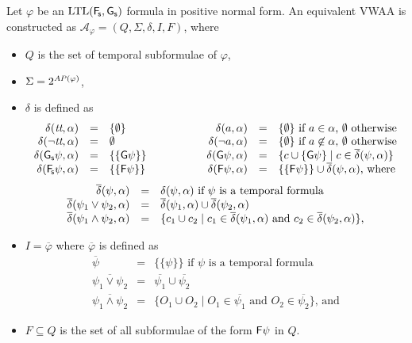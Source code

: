 \documentclass{llncs}
\newcommand{\true}{\textrm{{\it tt}}}
\newcommand{\AP}{\mathit{A\hskip-0.1ex P}}
\newcommand{\LTL}{{\mathrm{LTL}}}
\newcommand{\mA}{\mathcal{A}}
\begin{document}
Let $\varphi$ be an $\LTL(\Fs,\Gs)$ formula in positive normal form.  An
equivalent VWAA is constructed as $\mA_\varphi=(Q,\Sigma,\delta,I,F)$, where
\begin{itemize}
\item $Q$ is the set of temporal subformulae of $\varphi$,
\item $\Sigma=2^{\AP(\varphi)}$,
\item $\delta$ is defined as 
  \[
  \begin{array}{rclp{8ex}rcl}
    \delta(\true,\alpha) & = & \{\emptyset\} 
    && \delta(a,\alpha) & = &
    \{\emptyset\} \textrm{ if }a\in\alpha\textrm{, }\emptyset\textrm{ otherwise} 
    \\
    \delta(\neg\true,\alpha) & = & \emptyset 
    && \delta(\neg a,\alpha) & = & 
    \{\emptyset\} \textrm{ if }a\not\in\alpha\textrm{, }\emptyset\textrm{ otherwise} 
    \\
    \delta(\Gs\psi,\alpha) & = & \{\{\G\psi\}\} 
    && \delta(\G\psi,\alpha) & = & \{c\cup\{\G\psi\}\mid c\in\overline{\delta}(\psi,\alpha)\}
    \\
    \delta(\Fs\psi,\alpha) & = & \{\{\F\psi\}\} 
    && \delta(\F\psi,\alpha) & = &
    \{\{\F\psi\}\}\cup\overline{\delta}(\psi,\alpha)\textrm{, where}
    \\
  \end{array}
  \]
  \[
  \begin{array}{rcl}
    \overline{\delta}(\psi,\alpha) & = & 
    \delta(\psi,\alpha)\ \textrm{if }\psi\textrm{ is a temporal formula} \\
    \overline{\delta}(\psi_1\lor\psi_2,\alpha) & = & \overline{\delta}(\psi_1,\alpha)\cup\overline{\delta}(\psi_2,\alpha) \\
    \overline{\delta}(\psi_1\land\psi_2,\alpha) & = & 
    \{c_1\cup c_2\mid c_1\in\overline{\delta}(\psi_1,\alpha)\textrm{ and }c_2\in\overline{\delta}(\psi_2,\alpha)\}\textrm, \\
  \end{array}
  \]
\item $I=\overline{\varphi}$ where $\overline{\varphi}$ is defined
  as 
  \[
  \begin{array}{rcl}
    \overline{\psi} & = & \{\{\psi\}\}\textrm{ if }\psi\textrm{ is a temporal formula} \\
    \overline{\psi_1 \vee \psi_2} & = & \overline{\psi_1}\cup\overline{\psi_2} \\
    \overline{\psi_1\land\psi_2} & = &
    \{O_1\cup O_2\mid O_1\in\overline{\psi_1}\textrm{ and }O_2\in\overline{\psi_2}\} \textrm{, and}
  \end{array}
  \]
\item $F\subseteq Q$ is the set of all subformulae of the form $\mathsf{F}\psi$ in $Q$.
\end{itemize}
\end{document}
